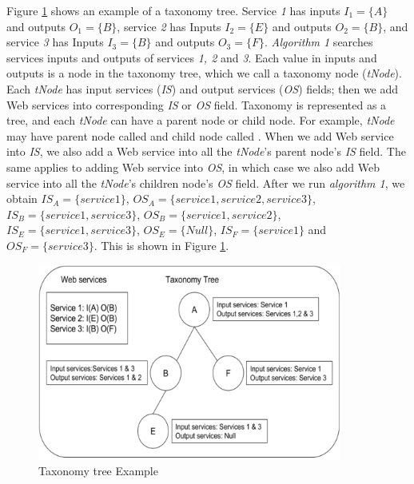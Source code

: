 \begin{exmp}
Figure \ref{fig:taxonomyTree} shows an example of a taxonomy tree. Service \emph{1} has inputs $I_1 = \{A\}$ and outputs $O_1 = \{B\}$, service \emph{2} has Inputs $I_2 = \{E\}$  and outputs $O_2 = \{B\}$, and service \emph{3} has Inputs $I_3 = \{B\}$  and outputs $O_3 = \{F\}$. \emph{Algorithm 1} searches services inputs and outputs of services \emph{1, 2} and \emph{3}. Each value in inputs and outputs is a node in the taxonomy tree, which we call a taxonomy node (\emph{tNode}). Each \emph{tNode} has input services (\emph{IS}) and output services (\emph{OS}) fields; then we add Web services into corresponding \emph{IS} or \emph{OS} field. Taxonomy is represented as a tree, and each \emph{tNode} can have a parent node or child node. For example,  \emph{tNode} may have parent node called  and child node called . When we add Web service into \emph{IS}, we also add a Web service into all the \emph{tNode}'s parent node's \emph{IS} field. The same applies to adding Web service into \emph{OS}, in which case we also add Web service into all the \emph{tNode}'s children node's \emph{OS} field. After we run \emph{algorithm 1}, we obtain $IS_A = \{service 1\}$, $OS_A = \{service 1, service 2, service 3\}$, $IS_B = \{service 1, service 3\}$, $OS_B = \{service 1, service 2\}$, $IS_E = \{service 1, service 3\}$, $OS_E = \{Null\}$, $IS_F = \{service 1\}$ and $OS_F = \{service 3\}$. This is shown in Figure \ref{fig:taxonomyTree}. \par
\end{exmp}

\begin{figure}[h]
\includegraphics[width = 10cm]{taxonomy-tree-example.pdf}
\centering
\caption{Taxonomy tree Example}
\label{fig:taxonomyTree} 
\end{figure} 

